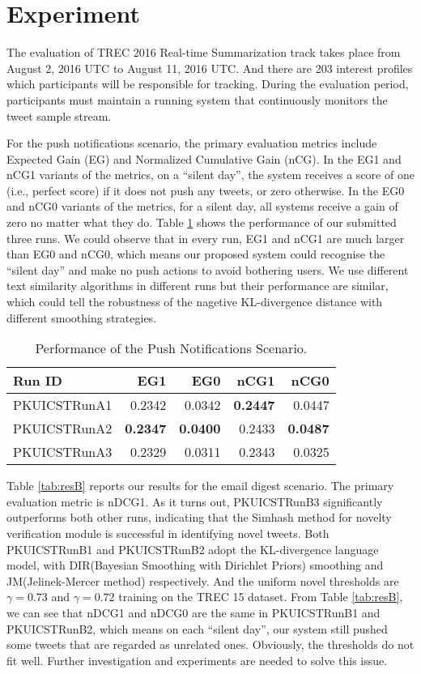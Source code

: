\section{Experiment}
The evaluation of TREC 2016 Real-time Summarization track takes place from
August 2, 2016 UTC to August 11, 2016 UTC.
And there are 203 interest profiles which participants will be responsible for tracking.
During the evaluation period, participants must maintain a running system
that continuously monitors the tweet sample stream.

For the push notifications scenario, the primary evaluation metrics
include Expected Gain (EG) and Normalized Cumulative Gain (nCG).
In the EG1 and nCG1 variants of the metrics, on a ``silent day'',
the system receives a score of one (i.e., perfect score) if it does not push any tweets,
or zero otherwise. In the EG0 and nCG0 variants of the metrics, for a silent day,
all systems receive a gain of zero no matter what they do.
Table \ref{tab:resA} shows the performance of our submitted three runs.
We could observe that in every run, EG1 and nCG1 are much larger than EG0 and nCG0,
which means our proposed system could recognise the ``silent day''
and make no push actions to avoid bothering users.
We use different text similarity algorithms in different runs
but their performance are similar, which could tell the robustness
of the nagetive KL-divergence distance with different smoothing strategies.

\begin{table}[htbp]
\centering
\caption{Performance of the Push Notifications Scenario.}
\label{tab:resA}
\begin{tabular}{lrrrr}
\hline
Run ID&EG1&EG0&nCG1&nCG0\\
\hline
PKUICSTRunA1&0.2342&0.0342&\textbf{0.2447}&0.0447\\
PKUICSTRunA2&\textbf{0.2347}&\textbf{0.0400}&0.2433&\textbf{0.0487}\\
PKUICSTRunA3&0.2329&0.0311&0.2343&0.0325\\
\hline
\end{tabular}
\end{table}

Table \ref{tab:resB} reports our results for the email digest scenario.
The primary evaluation metric is nDCG1.
As it turns out, PKUICSTRunB3 significantly outperforms both other runs,
indicating that the Simhash method for novelty verification module is successful in identifying novel tweets.
Both PKUICSTRunB1 and PKUICSTRunB2 adopt the KL-divergence language model,
with DIR(Bayesian Smoothing with Dirichlet Priors) smoothing and JM(Jelinek-Mercer method) respectively.
And the uniform novel thresholds are $\gamma=0.73$ and $\gamma=0.72$ training on the TREC 15 dataset.
From Table \ref{tab:resB}, we can see that nDCG1 and nDCG0 are the same in PKUICSTRunB1 and PKUICSTRunB2,
which means on each ``silent day'', our system still pushed some tweets that are regarded as unrelated ones.
Obviously, the thresholds do not fit well. Further investigation and experiments are needed to solve this issue.

